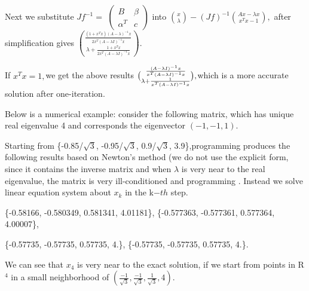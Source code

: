 \documentclass{article}
\begin{document}
Next we substitute $Jf^{-1}=$ $\left( 
\begin{array}{cc}
B & \beta  \\ 
\alpha ^{T} & c%
\end{array}%
\right) $ into $\binom{x}{\lambda }-\left( Jf\right) ^{-1}\binom{Ax-\lambda x%
}{x^{T}x-1},$ after simplification gives $\binom{\frac{\left(
1+x^{T}x\right) \left( A-\lambda \right) ^{-1}x}{2x^{T}\left( A-\lambda
I\right) ^{-1}x}}{\lambda +\frac{1+x^{T}x}{2x^{T}\left( A-\lambda I\right)
^{-1}x}}.$

If $x^{T}x=1,$we get the above results $\binom{\frac{\left( A-\lambda
I\right) ^{-1}x}{x^{T}\left( A-\lambda I\right) ^{-1}x}}{\lambda +\frac{1}{%
x^{T}\left( A-\lambda I\right) ^{-1}x}},$which is a more accurate solution
after one-iteration.

Below is a numerical example: consider the following matrix, which has
unique real eigenvalue 4 and corresponds the eigenvector $\left(
-1,-1,1\right) .$ 

Starting from \{-0.85/$\sqrt{3}$, -0.95/$\sqrt{3}$, 0.9/$\sqrt{3}$,
3.9\},programming produces the following results based on Newton's method
(we do not use the explicit form, since it contains the inverse matrix and
when $\lambda $ is very near to the real eigenvalue, the matrix is very
ill-conditioned and programming . Instead we solve linear equation system
about $x_{k}$ in the k$-th$ step.

\{-0.58166, -0.580349, 0.581341, 4.01181\}, \{-0.577363, -0.577361,
0.577364, 4.00007\},

\{-0.57735, -0.57735, 0.57735, 4.\}, \{-0.57735, -0.57735, 0.57735, 4.\}.

We can see that $x_{4}$ is very near to the exact solution, if we start from
points in R$^{4}$ in a small neighborhood of $\left( \frac{-1}{\sqrt{3}},%
\frac{-1}{\sqrt{3}},\frac{1}{\sqrt{3}},4\right) .$
\end{document}
